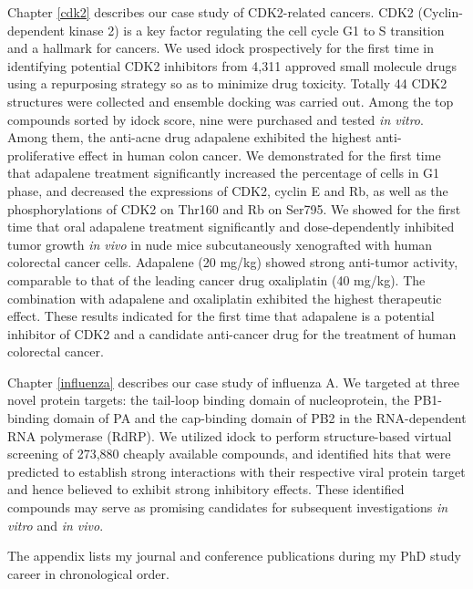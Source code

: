 Chapter \ref{cdk2} describes our case study of CDK2-related cancers. CDK2 (Cyclin-dependent kinase 2) is a key factor regulating the cell cycle G1 to S transition and a hallmark for cancers. We used idock \citep{1153,1362} prospectively for the first time in identifying potential CDK2 inhibitors from 4,311 approved small molecule drugs using a repurposing strategy so as to minimize drug toxicity. Totally 44 CDK2 structures were collected and ensemble docking was carried out. Among the top compounds sorted by idock score, nine were purchased and tested \textit{in vitro}. Among them, the anti-acne drug adapalene exhibited the highest anti-proliferative effect in human colon cancer. We demonstrated for the first time that adapalene treatment significantly increased the percentage of cells in G1 phase, and decreased the expressions of CDK2, cyclin E and Rb, as well as the phosphorylations of CDK2 on Thr160 and Rb on Ser795. We showed for the first time that oral adapalene treatment significantly and dose-dependently inhibited tumor growth \textit{in vivo} in nude mice subcutaneously xenografted with human colorectal cancer cells. Adapalene (20 mg/kg) showed strong anti-tumor activity, comparable to that of the leading cancer drug oxaliplatin (40 mg/kg). The combination with adapalene and oxaliplatin exhibited the highest therapeutic effect. These results indicated for the first time that adapalene is a potential inhibitor of CDK2 and a candidate anti-cancer drug for the treatment of human colorectal cancer.

Chapter \ref{influenza} describes our case study of influenza A. We targeted at three novel protein targets: the tail-loop binding domain of nucleoprotein, the PB1-binding domain of PA and the cap-binding domain of PB2 in the RNA-dependent RNA polymerase (RdRP). We utilized idock \citep{1153,1362} to perform structure-based virtual screening of 273,880 cheaply available compounds, and identified hits that were predicted to establish strong interactions with their respective viral protein target and hence believed to exhibit strong inhibitory effects. These identified compounds may serve as promising candidates for subsequent investigations \textit{in vitro} and \textit{in vivo}.

The appendix lists my journal and conference publications during my PhD study career in chronological order.

\chapterend
